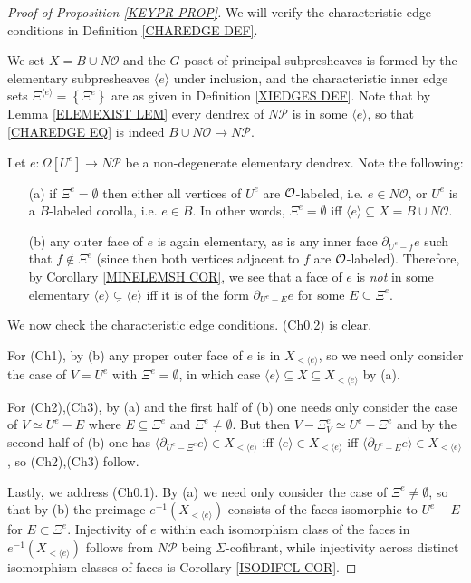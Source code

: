 \documentclass[a4paper,10pt
,draft
]{article}%
\renewcommand{\1}{\eta}%
\begin{document}
\begin{proof}[Proof of Proposition \ref{KEYPR PROP}]

We will verify the characteristic edge conditions in Definition \ref{CHAREDGE DEF}.

We set $X = B \cup N\mathcal{O}$
and the $G$-poset of principal subpresheaves is formed by the 
elementary subpresheaves 
$\langle e \rangle$
under inclusion, and the characteristic inner edge sets
$\Xi^{\langle e \rangle} = \left\{\Xi^{e}\right\}$ are as given in Definition \ref{XIEDGES DEF}.
Note that by Lemma \ref{ELEMEXIST LEM}
every dendrex of $N \mathcal{P}$ is in some 
$\langle e \rangle$, so that \eqref{CHAREDGE EQ} is indeed
$B \cup N\mathcal{O} \to N \mathcal{P}$.


Let $e\colon \Omega[U^e] \to N \mathcal{P}$
be a non-degenerate elementary dendrex. Note the following: 
\begin{itemize}
\item[(a)] if $\Xi^e = \emptyset$ then 
either all vertices of $U^e$ are $\mathcal{O}$-labeled, i.e. $e \in N \mathcal{O}$, or $U^e$ is a $B$-labeled corolla, i.e. $e \in B$.
In other words, $\Xi^e = \emptyset$ iff 
$\langle e \rangle \subseteq X = B \cup N\mathcal{O}$.
\item[(b)] any outer face of $e$ is again elementary,
as is any inner face $\partial_{U^e-f} e$ such that $f \not \in \Xi^e$
(since then both vertices adjacent to $f$ are $\mathcal{O}$-labeled).
Therefore, by Corollary \ref{MINELEMSH COR},
we see that a face of $e$ is \emph{not} in
some elementary $\langle \bar{e} \rangle \subsetneq \langle e \rangle$
iff it is of the form
$\partial_{U^e - E} e$
for some $E \subseteq \Xi^e$.
\end{itemize}


We now check the characteristic edge conditions. (Ch0.2) is clear.

For (Ch1), by (b) any proper outer face of $e$ is in $X_{<\langle e\rangle}$, so we need only consider the case of
$V=U^e$ with $\Xi^e=\emptyset$, in which case
$\langle e \rangle \subseteq X \subseteq X_{<\langle e\rangle}$ by (a).

For (Ch2),(Ch3), by (a) and the first half of (b) one needs only consider the case of
$V \simeq U^e - E$ where $E \subseteq \Xi^e$ and $\Xi^e \neq \emptyset$.
But then
$V - \Xi^e_V \simeq U^e- \Xi^e$
and by the second half of (b)
one has
$\langle \partial_{U^e-\Xi^e}e \rangle \in  X_{<\langle e\rangle}$
iff
$\langle e \rangle \in  X_{<\langle e\rangle}$
iff
$\langle \partial_{U^e-E}e \rangle \in  X_{<\langle e\rangle}$,
so (Ch2),(Ch3) follow.



Lastly, we address (Ch0.1). By (a) we need only consider the case of $\Xi^e \neq \emptyset$,
so that by (b) the preimage
$e^{-1}(X_{<\langle e\rangle})$
consists of the faces 
isomorphic to
$U^e-E$ for $E \subset \Xi^e$.
Injectivity of $e$ within each isomorphism class of the faces in 
$e^{-1}(X_{<\langle e\rangle})$
follows from $N \mathcal{P}$ being $\Sigma$-cofibrant,
while injectivity across distinct isomorphism classes of faces is
Corollary \ref{ISODIFCL COR}.
\end{proof}
\end{document}

